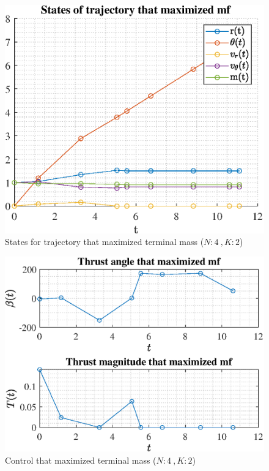 \documentclass[]{article}
\begin{document}
	\begin{figure}
		\centering
		\includegraphics[scale=0.75]{states_N4_K2_C3_mf.eps}
		\caption{States for trajectory that maximized terminal mass (\(N:4\ , K:2\))}
		\label{fig:states_N4_K2_C3_mf}
	\end{figure}
	\begin{figure}
		\centering
		\includegraphics[scale=0.75]{control_N4_K2_C3_mf.eps}
		\caption{Control that maximized terminal mass (\(N:4\ , K:2\))}
		\label{fig:control_N4_K2_C3_mf}
	\end{figure}
\end{document}
